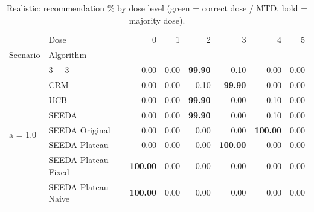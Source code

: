 \begin{table}[H]
\centering
\caption{Realistic: recommendation \% by dose level (green = correct dose / MTD, bold = majority dose).}
\label{tab:real_rec_by_dose}
\begin{tabular}{llrrrrrr}
\toprule
 & Dose & 0 & 1 & 2 & 3 & 4 & 5 \\
Scenario & Algorithm &  &  &  &  &  &  \\
\midrule
\multirow[c]{8}{*}{a = 1.0} & 3 + 3 & 0.00 & 0.00 & {\cellcolor[HTML]{C8E6C9}} \bfseries 99.90 & 0.10 & 0.00 & 0.00 \\
 & CRM & 0.00 & 0.00 & {\cellcolor[HTML]{C8E6C9}} 0.10 & \bfseries 99.90 & 0.00 & 0.00 \\
 & UCB & 0.00 & 0.00 & {\cellcolor[HTML]{C8E6C9}} \bfseries 99.90 & 0.00 & 0.10 & 0.00 \\
 & SEEDA & 0.00 & 0.00 & {\cellcolor[HTML]{C8E6C9}} \bfseries 99.90 & 0.00 & 0.10 & 0.00 \\
 & SEEDA Original & 0.00 & 0.00 & {\cellcolor[HTML]{C8E6C9}} 0.00 & 0.00 & \bfseries 100.00 & 0.00 \\
 & SEEDA Plateau & 0.00 & 0.00 & {\cellcolor[HTML]{C8E6C9}} 0.00 & \bfseries 100.00 & 0.00 & 0.00 \\
 & SEEDA Plateau Fixed & \bfseries 100.00 & 0.00 & {\cellcolor[HTML]{C8E6C9}} 0.00 & 0.00 & 0.00 & 0.00 \\
 & SEEDA Plateau Naive & \bfseries 100.00 & 0.00 & {\cellcolor[HTML]{C8E6C9}} 0.00 & 0.00 & 0.00 & 0.00 \\
\bottomrule
\end{tabular}
\end{table}
